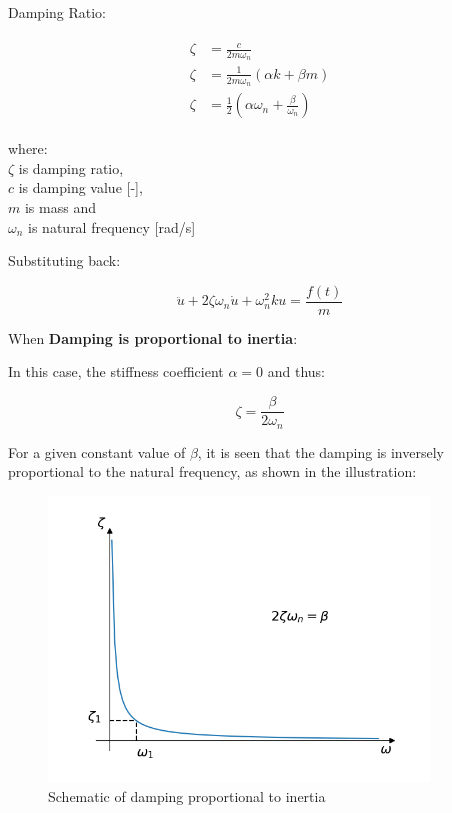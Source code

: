 \documentclass[10pt,b5paper,titlepage]{book}
\newenvironment{ematrix}
{
    \begin{eqnarray}
        \begin{aligned}
}
{
        \end{aligned}
    \end{eqnarray}
}
\begin{document}
Damping Ratio:

\begin{ematrix}
    \zeta &= \frac{c}{2 m \omega_n}\\
    \zeta &= \frac{1}{2 m \omega_n} \left( \alpha k + \beta m \right)\\
    \zeta &= \frac{1}{2} \left( \alpha \omega_n + \frac{\beta}{\omega_n} \right)
\end{ematrix}

where:\\
$ \zeta $ is damping ratio,\\
$ c $ is damping value [-],\\
$ m $ is mass and\\
$ \omega_n $ is natural frequency [rad/s]

Substituting back:

\begin{equation}
    \ddot{u} + 2 \zeta \omega_n \dot{u} + \omega_n^2 k u = \frac{f(t)}{m}
\end{equation}


When \textbf{Damping is proportional to inertia}:

In this case, the stiffness coefficient $ \alpha = 0 $ and thus:

\begin{equation}
    \zeta = \frac{\beta}{2 \omega_n}
\end{equation}

For a given constant value of $ \beta $, it is seen that the damping is inversely
proportional to the natural frequency, as shown in the illustration:

\begin{figure}[ht]
    \centering
    \includegraphics[width=0.90\textwidth]{img/inertia_dependent_damping.png}
    \caption{Schematic of damping proportional to inertia}
    \label{fig:inertia-dependent-damping-png}
\end{figure}
\end{document}
